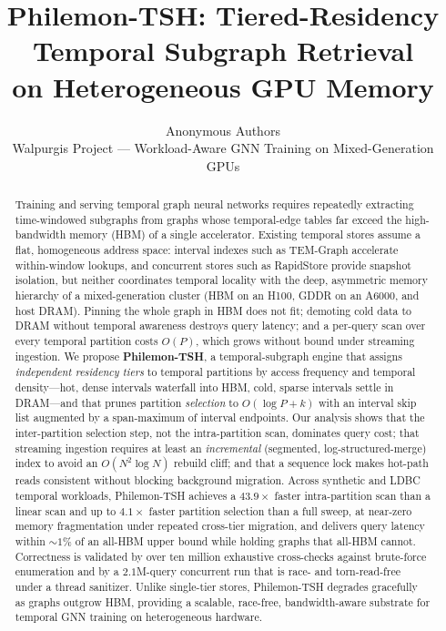 \documentclass[10pt]{article}
\title{\textbf{Philemon-TSH}: Tiered-Residency Temporal Subgraph Retrieval\\
       on Heterogeneous GPU Memory}
\author{
  Anonymous Authors\\[2pt]
  Walpurgis Project --- Workload-Aware GNN Training on Mixed-Generation GPUs
}
\date{}
\theoremstyle{definition}
\begin{document}
\maketitle

\begin{abstract}
Training and serving temporal graph neural networks requires repeatedly
extracting time-windowed subgraphs from graphs whose temporal-edge tables far
exceed the high-bandwidth memory (HBM) of a single accelerator. Existing temporal
stores assume a flat, homogeneous address space: interval indexes such as
TEM-Graph accelerate within-window lookups, and concurrent stores such as
RapidStore provide snapshot isolation, but neither coordinates temporal locality
with the deep, asymmetric memory hierarchy of a mixed-generation cluster (HBM on
an H100, GDDR on an A6000, and host DRAM). Pinning the whole graph in HBM does not
fit; demoting cold data to DRAM without temporal awareness destroys query latency;
and a per-query scan over every temporal partition costs $O(P)$, which grows
without bound under streaming ingestion. We propose \textbf{Philemon-TSH}, a
temporal-subgraph engine that assigns \emph{independent residency tiers} to
temporal partitions by access frequency and temporal density---hot, dense
intervals waterfall into HBM, cold, sparse intervals settle in DRAM---and that
prunes partition \emph{selection} to $O(\log P + k)$ with an interval skip list
augmented by a span-maximum of interval endpoints. Our analysis shows that the
inter-partition selection step, not the intra-partition scan, dominates query
cost; that streaming ingestion requires at least an \emph{incremental} (segmented,
log-structured-merge) index to avoid an $O(N^2\log N)$ rebuild cliff; and that a
sequence lock makes hot-path reads consistent without blocking background
migration. Across synthetic and LDBC temporal workloads, Philemon-TSH achieves a
$\mathbf{43.9\times}$ faster intra-partition scan than a linear scan and up to
$\mathbf{4.1\times}$ faster partition selection than a full sweep, at near-zero
memory fragmentation under repeated cross-tier migration, and delivers query
latency within ${\sim}1\%$ of an all-HBM upper bound while holding graphs that
all-HBM cannot. Correctness is validated by over ten million exhaustive
cross-checks against brute-force enumeration and by a $2.1$M-query concurrent run
that is race- and torn-read-free under a thread sanitizer. Unlike single-tier
stores, Philemon-TSH degrades gracefully as graphs outgrow HBM, providing a
scalable, race-free, bandwidth-aware substrate for temporal GNN training on
heterogeneous hardware.
\end{abstract}
\end{document}
